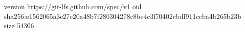 version https://git-lfs.github.com/spec/v1
oid sha256:e1562065a3e27e20a48b7f280304278c8be4c3f70402cbdf911ccba4b265b23b
size 54306
